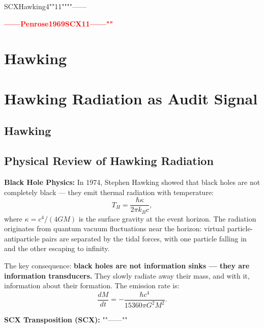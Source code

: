 \documentclass[12pt,a4paper]{article}
\theoremstyle{remark}
\newcommand{\honestcrit}[1]{%
    \textcolor{red}{\textbf{#1}}%
}
\begin{document}
\vspace{4pt}
\noindent
\textbf{} SCXHawking4""11""""——

\honestcrit{——Penrose1969SCX11——""}

\section{Hawking}
\section{Hawking Radiation as Audit Signal}

\subsection{Hawking}
\subsection{Physical Review of Hawking Radiation}

\noindent
\textbf{Black Hole Physics:} In 1974, Stephen Hawking showed that black holes are not completely black — they emit thermal radiation with temperature:
\begin{equation}
    T_H = \frac{\hbar \kappa}{2\pi k_B c},
    \label{eq:hawking_temp}
\end{equation}
where $\kappa = c^4/(4GM)$ is the surface gravity at the event horizon. The radiation originates from quantum vacuum fluctuations near the horizon: virtual particle-antiparticle pairs are separated by the tidal forces, with one particle falling in and the other escaping to infinity.

The key consequence: \textbf{black holes are not information sinks — they are information transducers.} They slowly radiate away their mass, and with it, information about their formation. The emission rate is:
\begin{equation}
    \frac{dM}{dt} = -\frac{\hbar c^4}{15360 \pi G^2 M^2}.
\end{equation}

\vspace{6pt}
\noindent
\textbf{SCX Transposition (SCX):} ""——""

\subsection{}
\end{document}
